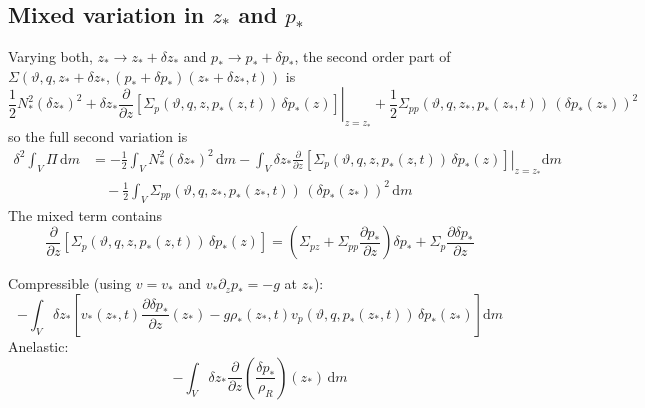 \documentclass{article}
\begin{document}
\subsection{Mixed variation in \texorpdfstring{\(z_*\)}{z*} and \texorpdfstring{\(p_*\)}{p*}}
Varying both, \(z_* \to z_* + \delta z_*\) and \(p_* \to p_* + \delta p_*\), the second order part of \(\Sigma(\vartheta, q, z_* + \delta z_*, (p_* + \delta p_*)(z_* + \delta z_*, t))\) is
\begin{equation}
    \frac{1}{2} N_*^2 (\delta z_*)^2
    + \delta z_*
    \left.
    \frac{\partial}{\partial z}
    \left[
        \Sigma_p(\vartheta, q, z, p_*(z, t)) \, \delta p_*(z)
    \right]
    \right|_{z = z_*}
    + \frac{1}{2} \Sigma_{pp}(\vartheta, q, z_*, p_*(z_*, t)) \, (\delta p_*(z_*))^2
\end{equation}
so the full second variation is
\begin{align}
    \delta^2 \int_V \Pi \, \mathrm{d}m
    & =
    - \frac{1}{2} \int_V N_*^2 (\delta z_*)^2 \, \mathrm{d}m
    - \int_V
    \delta z_*
    \left.
    \frac{\partial}{\partial z}
    \left[
        \Sigma_p(\vartheta, q, z, p_*(z, t)) \, \delta p_*(z)
    \right]
    \right|_{z = z_*}
    \mathrm{d}m
    \nonumber
    \\
    & \quad
    - \frac{1}{2} \int_V \Sigma_{pp}(\vartheta, q, z_*, p_*(z_*, t)) \, (\delta p_*(z_*))^2 \, \mathrm{d}m
\end{align}
The mixed term contains
\begin{equation}
    \frac{\partial}{\partial z}
    \left[
        \Sigma_p(\vartheta, q, z, p_*(z, t)) \, \delta p_*(z)
    \right]
    =
    \left(
        \Sigma_{pz}
        + \Sigma_{pp} \frac{\partial p_*}{\partial z}
    \right)
    \delta p_*
    + \Sigma_p \frac{\partial \delta p_*}{\partial z}
\end{equation}

Compressible (using \(v = v_*\) and \(v_* \partial_z p_* = - g\) at \(z_*\)):
\begin{equation}
    - \int_V
    \delta z_*
    \left[
        v_*(z_*, t) \frac{\partial \delta p_*}{\partial z}(z_*)
        - g \rho_*(z_*, t) v_p(\vartheta, q, p_*(z_*, t)) \, \delta p_*(z_*)
    \right]
    \mathrm{d}m
\end{equation}
Anelastic:
\begin{equation}
    - \int_V
    \delta z_*
    \frac{\partial}{\partial z}
    \left(
        \frac{\delta p_*}{\rho_R}
    \right) (z_*)
    \, \mathrm{d}m
\end{equation}
\end{document}
